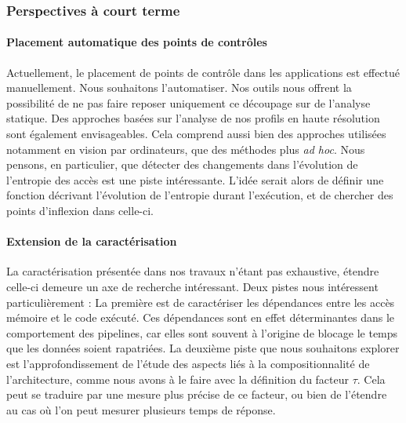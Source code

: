 \subsubsection{Perspectives à court terme}

\paragraph{Placement automatique des points de contrôles}
Actuellement, le placement de points de contrôle dans les applications est effectué manuellement.
Nous souhaitons l'automatiser.
Nos outils nous offrent la possibilité de ne pas faire reposer uniquement ce découpage sur de l'analyse statique.
Des approches basées sur l'analyse de nos profils en haute résolution sont également envisageables.
Cela comprend aussi bien des approches utilisées notamment en vision par ordinateurs, que des méthodes plus \emph{ad hoc}.
Nous pensons, en particulier, que détecter des changements dans l'évolution de l'entropie des accès est une piste intéressante.
L'idée serait alors de définir une fonction décrivant l'évolution de l'entropie durant l'exécution, et de chercher des points d'inflexion dans celle-ci.

\paragraph{Extension de la caractérisation}
La caractérisation présentée dans nos travaux n'étant pas exhaustive, étendre celle-ci demeure un axe de recherche intéressant.
Deux pistes nous intéressent particulièrement :
La première est de caractériser les dépendances entre les accès mémoire et le code exécuté.
Ces dépendances sont en effet déterminantes dans le comportement des pipelines, car elles sont souvent à l'origine de blocage le temps que les données soient rapatriées.
La deuxième piste que nous souhaitons explorer est l'approfondissement de l'étude des aspects liés à la compositionnalité de l'architecture, comme nous avons à le faire avec la définition du facteur $\tau$.
Cela peut se traduire par une mesure plus précise de ce facteur, ou bien de l'étendre au cas où l'on peut mesurer plusieurs temps de réponse.

